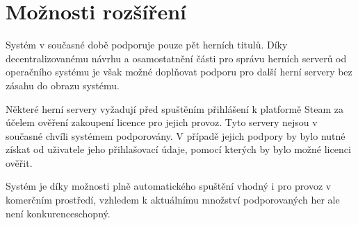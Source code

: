 \section{Možnosti rozšíření}

Systém v současné době podporuje pouze pět herních titulů. Díky decentralizovanému návrhu
a osamostatnění části pro správu herních serverů od operačního systému je však možné doplňovat podporu
pro další herní servery bez zásahu do obrazu systému.

Některé herní servery vyžadují před spuštěním přihlášení k platformě Steam za účelem ověření zakoupení licence
pro jejich provoz. Tyto servery nejsou v současné chvíli systémem podporovány. V případě jejich podpory
by bylo nutné získat od uživatele jeho přihlašovací údaje, pomocí kterých by bylo možné licenci ověřit.

Systém je díky možnosti plně automatického spuštění vhodný i pro provoz v komerčním prostředí, vzhledem k aktuálnímu
množství podporovaných her ale není konkurenceschopný.